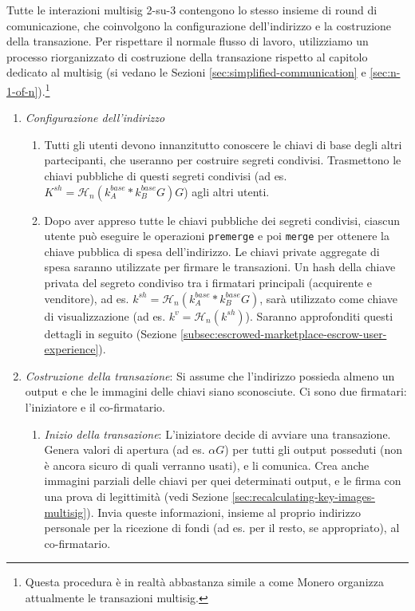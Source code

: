 Tutte le interazioni multisig 2-su-3 contengono lo stesso insieme di round di comunicazione, che coinvolgono la configurazione dell'indirizzo e la costruzione della transazione. Per rispettare il normale flusso di lavoro, utilizziamo un processo riorganizzato di costruzione della transazione rispetto al capitolo dedicato al multisig (si vedano le Sezioni \ref{sec:simplified-communication} e \ref{sec:n-1-of-n}).\footnote{Questa procedura è in realtà abbastanza simile a come Monero organizza attualmente le transazioni multisig.}
\begin{enumerate}
    \item {\em Configurazione dell'indirizzo}
    \begin{enumerate}
        \item Tutti gli utenti devono innanzitutto conoscere le chiavi di base degli altri partecipanti, che useranno per costruire segreti condivisi. Trasmettono le chiavi pubbliche di questi segreti condivisi (ad es. $K^{sh} = \mathcal{H}_n(k^{base}_A*k^{base}_B G) G$) agli altri utenti.
        \item Dopo aver appreso tutte le chiavi pubbliche dei segreti condivisi, ciascun utente può eseguire le operazioni {\tt premerge} e poi {\tt merge} per ottenere la chiave pubblica di spesa dell'indirizzo. Le chiavi private aggregate di spesa saranno utilizzate per firmare le transazioni. Un hash della chiave privata del segreto condiviso tra i firmatari principali (acquirente e venditore), ad es. $k^{sh} = \mathcal{H}_n(k^{base}_A*k^{base}_B G)$, sarà utilizzato come chiave di visualizzazione (ad es. $k^v = \mathcal{H}_n(k^{sh})$). Saranno approfonditi questi dettagli in seguito (Sezione \ref{subsec:escrowed-marketplace-escrow-user-experience}).
    \end{enumerate}{}
    \item {\em Costruzione della transazione}: Si assume che l'indirizzo possieda almeno un output e che le immagini delle chiavi siano sconosciute. Ci sono due firmatari: l'iniziatore e il co-firmatario.
    \begin{enumerate}
        \item {\em Inizio della transazione}: L'iniziatore decide di avviare una transazione. Genera valori di apertura (ad es. $\alpha G$) per tutti gli output posseduti (non è ancora sicuro di quali verranno usati), e li comunica. Crea anche immagini parziali delle chiavi per quei determinati output, e le firma con una prova di legittimità (vedi Sezione \ref{sec:recalculating-key-images-multisig}). Invia queste informazioni, insieme al proprio indirizzo personale per la ricezione di fondi (ad es. per il resto, se appropriato), al co-firmatario.

\end{enumerate}
\end{enumerate}
